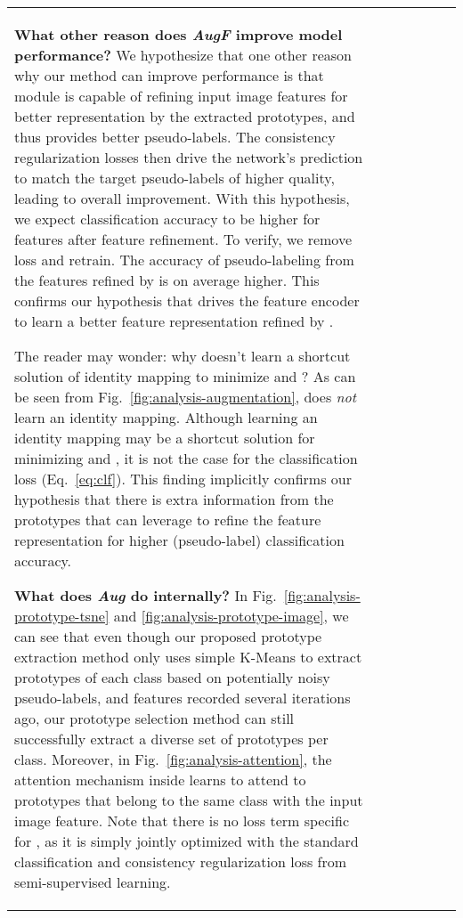 \documentclass[runningheads]{llncs}
\begin{document}
\begin{table*}[t]
{\begin{tabular}{@{\extracolsep{4pt}}lcccccc@{}}
{\noindent
\textbf{What other reason does \textit{AugF} improve model performance?}
We hypothesize that one other reason why our method can improve performance is that  module is capable of refining input image features for better representation by the extracted prototypes, and thus provides better pseudo-labels.
The consistency regularization losses then drive the network's prediction to match the target pseudo-labels of higher quality, leading to overall improvement.
With this hypothesis, we expect classification accuracy to be higher for features after feature refinement.
To verify, we remove  loss and retrain.
The accuracy of pseudo-labeling from the features refined by  is on average  higher.
This confirms our hypothesis that  drives the feature encoder to learn a better feature representation refined by .

The reader may wonder: why doesn't  learn a shortcut solution of identity mapping to minimize  and ?
As can be seen from Fig.~\ref{fig:analysis-augmentation},  does \emph{not} learn an identity mapping.
Although learning an identity mapping may be a shortcut solution for minimizing  and , it is not the case for the classification loss  (Eq.~\ref{eq:clf}).
This finding implicitly confirms our hypothesis that there is extra information from the prototypes that  can leverage to refine the feature representation for higher (pseudo-label) classification accuracy.

\noindent
\textbf{What does \textit{Aug} do internally?}
In Fig.~\ref{fig:analysis-prototype-tsne} and \ref{fig:analysis-prototype-image}, we can see that even though our proposed prototype extraction method only uses simple K-Means to extract prototypes of each class based on potentially noisy pseudo-labels, and features recorded several iterations ago, our prototype selection method can still successfully extract a diverse set of prototypes per class.
Moreover, in Fig.~\ref{fig:analysis-attention}, the attention mechanism inside  learns to attend to prototypes that belong to the same class with the input image feature.
Note that there is no loss term specific for , as it is simply jointly optimized with the standard classification and consistency regularization loss from semi-supervised learning.

}
\end{tabular}}
\end{table*}
\end{document}
